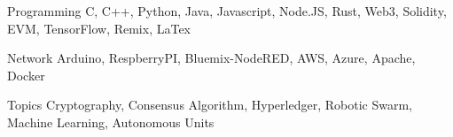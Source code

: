 


\begin{cvskills}


\cvskill
{Programming} %
{C, C++, Python, Java, Javascript, Node.JS, Rust, Web3, Solidity, EVM, TensorFlow, Remix, LaTex} %


\cvskill
{Network} %
{Arduino, RespberryPI, Bluemix-NodeRED, AWS, Azure, Apache, Docker} %


\cvskill
{Topics} %
{Cryptography, Consensus Algorithm, Hyperledger, Robotic Swarm, Machine Learning, Autonomous Units} %

\end{cvskills}